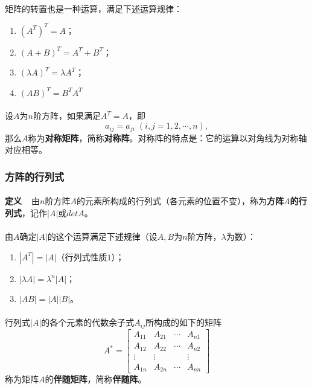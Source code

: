 \paragraph{}
矩阵的转置也是一种运算，满足下述运算规律：
\begin{enumerate}
  \item $(A^T)^T = A$；
  \item $(A+B)^T = A^T + B^T$；
  \item $(\lambda A)^T = \lambda A^T$；
  \item $(AB)^T = B^TA^T$
\end{enumerate}

\paragraph{}
设$A$为$n$阶方阵，如果满足$A^T=A$，即
\begin{equation*}
  a_{ij}=a_{ji} \; (i,j=1,2,\cdots,n),
\end{equation*}
那么$A$称为\textbf{对称矩阵}，简称\textbf{对称阵}。对称阵的特点是：它的运算以对角线为对称轴对应相等。

\subsubsection{方阵的行列式}
\paragraph{}
\textbf{定义~~}由$n$阶方阵$A$的元素所构成的行列式（各元素的位置不变），称为\textbf{方阵$A$的行列式}，记作$|A|$或$detA$。

\paragraph{}
由$A$确定$|A|$的这个运算满足下述规律（设$A,B$为$n$阶方阵，$\lambda$为数）：
\begin{enumerate}
  \item $|A^T|=|A|$（行列式性质$1$）；
  \item $|\lambda A| = \lambda^n|A|$；
  \item $|AB|=|A||B|$。
\end{enumerate}

\paragraph{}
行列式$|A|$的各个元素的代数余子式$A_{ij}$所构成的如下的矩阵
\begin{equation*}
  A^* = \left[\begin{array}{cccc}
    A_{11} & A_{21} & \cdots & A_{n1} \\
    A_{12} & A_{22} & \cdots & A_{n2} \\
    \vdots & \vdots &  & \vdots \\
    A_{1n} & A_{2n} & \cdots & A_{nn}
  \end{array}\right]
\end{equation*}
称为矩阵$A$的\textbf{伴随矩阵}，简称\textbf{伴随阵}。

